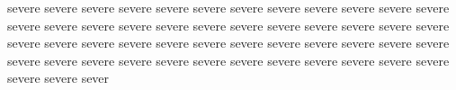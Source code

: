 \documentclass{article}
\begin{document}
severe severe severe severe severe severe severe severe severe severe severe severe severe severe severe severe severe severe severe severe severe severe severe severe severe severe severe severe severe severe severe severe severe severe severe severe severe severe severe severe severe severe severe severe severe severe severe severe severe severe sever
\end{document}
